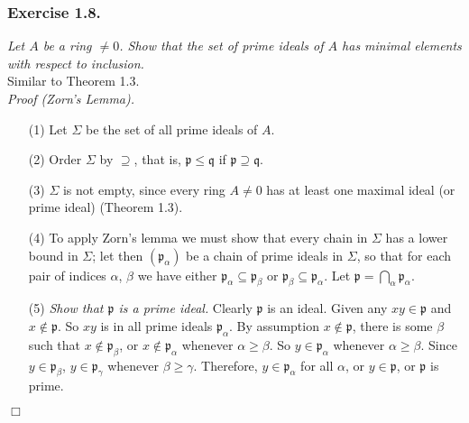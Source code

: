 \documentclass{article}
\begin{document}



\subsubsection*{Exercise 1.8.}
\emph{Let $A$ be a ring $\neq 0$.
Show that the set of prime ideals of $A$ has minimal elements
with respect to inclusion.} \\

Similar to Theorem 1.3. \\



\emph{Proof (Zorn's Lemma).}
\begin{enumerate}
\item[(1)]
  Let $\Sigma$ be the set of all prime ideals of $A$.

\item[(2)]
  Order $\Sigma$ by $\supseteq$, that is,
  $\mathfrak{p} \leq \mathfrak{q}$ if $\mathfrak{p} \supseteq \mathfrak{q}$.

\item[(3)]
  $\Sigma$ is not empty, since every ring $A \neq 0$
  has at least one maximal ideal (or prime ideal) (Theorem 1.3).

\item[(4)]
  To apply Zorn's lemma we must show that every chain in $\Sigma$ has a lower bound in $\Sigma$;
  let then $(\mathfrak{p}_\alpha)$ be a chain of prime ideals in $\Sigma$,
  so that for each pair of indices $\alpha$, $\beta$ we have either
  $\mathfrak{p}_\alpha \subseteq \mathfrak{p}_\beta$ or
  $\mathfrak{p}_\beta \subseteq \mathfrak{p}_\alpha$.
  Let $\mathfrak{p} = \bigcap_{\alpha} \mathfrak{p}_\alpha$.

\item[(5)]
  \emph{Show that $\mathfrak{p}$ is a prime ideal.}
  Clearly $\mathfrak{p}$ is an ideal.
  Given any $xy \in \mathfrak{p}$ and $x \not\in \mathfrak{p}$.
  So $xy$ is in all prime ideals $\mathfrak{p}_\alpha$.
  By assumption $x \not\in \mathfrak{p}$,
  there is some $\beta$ such that $x \not\in \mathfrak{p}_\beta$,
  or $x \not\in \mathfrak{p}_\alpha$ whenever $\alpha \geq \beta$.
  So $y \in \mathfrak{p}_\alpha$ whenever $\alpha \geq \beta$.
  Since $y \in \mathfrak{p}_\beta$, $y \in \mathfrak{p}_\gamma$ whenever $\beta \geq \gamma$.
  Therefore, $y \in \mathfrak{p}_\alpha$ for all $\alpha$,
  or $y \in \mathfrak{p}$,
  or $\mathfrak{p}$ is prime.
\end{enumerate}
$\Box$ \\\\
\end{document}
